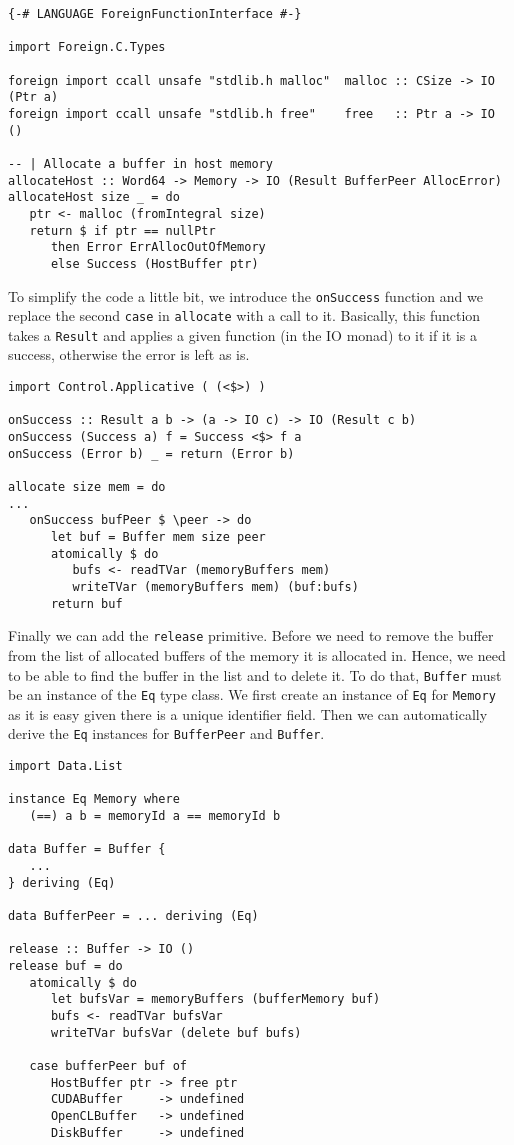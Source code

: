 \begin{lstlisting}
{-# LANGUAGE ForeignFunctionInterface #-}

import Foreign.C.Types

foreign import ccall unsafe "stdlib.h malloc"  malloc :: CSize -> IO (Ptr a)
foreign import ccall unsafe "stdlib.h free"    free   :: Ptr a -> IO ()

-- | Allocate a buffer in host memory
allocateHost :: Word64 -> Memory -> IO (Result BufferPeer AllocError)
allocateHost size _ = do
   ptr <- malloc (fromIntegral size)
   return $ if ptr == nullPtr
      then Error ErrAllocOutOfMemory
      else Success (HostBuffer ptr)
\end{lstlisting}


To simplify the code a little bit, we introduce the \texttt{onSuccess} function
and we replace the second \texttt{case} in \texttt{allocate} with a call to it.
Basically, this function takes a \texttt{Result} and applies a given function
(in the IO monad) to it if it is a success, otherwise the error is left as is.

\begin{lstlisting}
import Control.Applicative ( (<$>) )

onSuccess :: Result a b -> (a -> IO c) -> IO (Result c b)
onSuccess (Success a) f = Success <$> f a
onSuccess (Error b) _ = return (Error b)

allocate size mem = do
...
   onSuccess bufPeer $ \peer -> do
      let buf = Buffer mem size peer
      atomically $ do
         bufs <- readTVar (memoryBuffers mem)
         writeTVar (memoryBuffers mem) (buf:bufs)
      return buf
\end{lstlisting}

Finally we can add the \texttt{release} primitive. Before we need to remove the
buffer from the list of allocated buffers of the memory it is allocated in.
Hence, we need to be able to find the buffer in the list and to delete it. To do
that, \texttt{Buffer} must be an instance of the \texttt{Eq} type class. We
first create an instance of \texttt{Eq} for \texttt{Memory} as it is easy given
there is a unique identifier field. Then we can automatically derive the
\texttt{Eq} instances for \texttt{BufferPeer} and \texttt{Buffer}.

\begin{lstlisting}
import Data.List

instance Eq Memory where
   (==) a b = memoryId a == memoryId b

data Buffer = Buffer {
   ...
} deriving (Eq)

data BufferPeer = ... deriving (Eq)

release :: Buffer -> IO ()
release buf = do
   atomically $ do
      let bufsVar = memoryBuffers (bufferMemory buf)
      bufs <- readTVar bufsVar
      writeTVar bufsVar (delete buf bufs)

   case bufferPeer buf of
      HostBuffer ptr -> free ptr
      CUDABuffer     -> undefined
      OpenCLBuffer   -> undefined
      DiskBuffer     -> undefined
\end{lstlisting}


